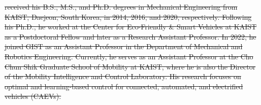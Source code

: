 \documentclass[letterpaper, journal]{IEEEtran}
\newcommand*{\template}{template}
\providecommand{\DIFdel}[1]{{\protect\color{red}\sout{#1}}} %
\providecommand{\DIFaddbegin}{} %
\providecommand{\DIFaddend}{} %
\providecommand{\DIFdelbegin}{} %
\providecommand{\DIFdelend}{} %
\begin{document}
\DIFdelbegin %
\DIFdel{received his B.S., M.S., and Ph.D. degrees in Mechanical Engineering from KAIST, Daejeon, South Korea, in 2014, 2016, and 2020, respectively. Following his Ph.D., he worked at the Center for Eco-Friendly \& Smart Vehicles at KAIST as a Postdoctoral Fellow and later as a Research Assistant Professor. In 2022, he joined GIST as an Assistant Professor in the Department of Mechanical and Robotics Engineering. Currently, he serves as an Assistant Professor at the Cho Chun Shik Graduate School of Mobility at KAIST, where he is also the Director of the Mobility Intelligence and Control Laboratory. His research focuses on optimal and learning-based control for connected, automated, and electrified vehicles (CAEVs).
}%
\DIFdelend %
\DIFaddbegin 

\DIFaddend 
\end{document}

